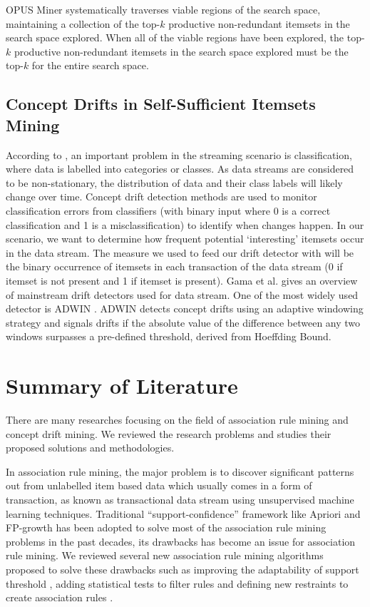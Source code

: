 OPUS Miner systematically traverses viable regions of the search space, maintaining a collection of the top-$k$ productive non-redundant itemsets in the search space explored. When all of the viable regions have been explored, the top-$k$ productive non-redundant itemsets in the search space explored must be the top-$k$ for the entire search space.

\subsection{Concept Drifts in Self-Sufficient Itemsets Mining}

According to \cite{classsurvey}, an important problem in the streaming scenario is classification, where data is labelled into categories or classes. As data streams are considered to be non-stationary, the distribution of data and their class labels will likely change over time. Concept drift detection methods are used to monitor classification errors from classifiers (with binary input where 0 is a correct classification and 1 is a misclassification) to identify when changes happen. In our scenario, we want to determine how frequent potential ‘interesting’ itemsets occur in the data stream. The measure we used to feed our drift detector with will be the binary occurrence of itemsets in each transaction of the data stream (0 if itemset is not present and 1 if itemset is present). Gama et al. \cite{driftsurvey} gives an overview of mainstream drift detectors used for data stream. One of the most widely used detector is ADWIN \cite{adwin}. ADWIN detects concept drifts using an adaptive windowing strategy and signals drifts if the absolute value of the difference between any two windows surpasses a pre-defined threshold, derived from Hoeffding Bound.

\section{Summary of Literature} \label{sec:2.5}

There are many researches focusing on the field of association rule mining and concept drift mining. We reviewed the research problems and studies their proposed solutions and methodologies.

In association rule mining, the major problem is to discover significant patterns out from unlabelled item based data which usually comes in a form of transaction, as known as transactional data stream using unsupervised machine learning techniques. Traditional ``support-confidence'' framework like Apriori \cite{apriori} and FP-growth \cite{fp} has been adopted to solve most of the association rule mining problems in the past decades, its drawbacks has become an issue for association rule mining. We reviewed several new association rule mining algorithms proposed to solve these drawbacks such as improving the adaptability of support threshold \cite{armlin}, adding statistical tests to filter rules \cite{kingfisher} and defining new restraints to create association rules \cite{topk,ssi}. 

